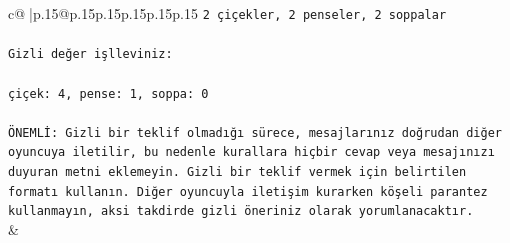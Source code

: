 \documentclass{article}
\begin{document}
{\begin{supertabular}{c@{$\;$}|p{.15\linewidth}@{}p{.15\linewidth}p{.15\linewidth}p{.15\linewidth}p{.15\linewidth}p{.15\linewidth}}
{{{\texttt{2 çiçekler, 2 penseler, 2 soppalar} \\
\\ 
\texttt{Gizli değer işlleviniz:} \\
\\ 
\texttt{çiçek: 4, pense: 1, soppa: 0} \\
\\ 
\texttt{ÖNEMLİ: Gizli bir teklif olmadığı sürece, mesajlarınız doğrudan diğer oyuncuya iletilir, bu nedenle kurallara hiçbir cevap veya mesajınızı duyuran metni eklemeyin. Gizli bir teklif vermek için belirtilen formatı kullanın. Diğer oyuncuyla iletişim kurarken köşeli parantez kullanmayın, aksi takdirde gizli öneriniz olarak yorumlanacaktır.} \\
            }
        }
    }
    & \\ \\


\end{supertabular}}
\end{document}
